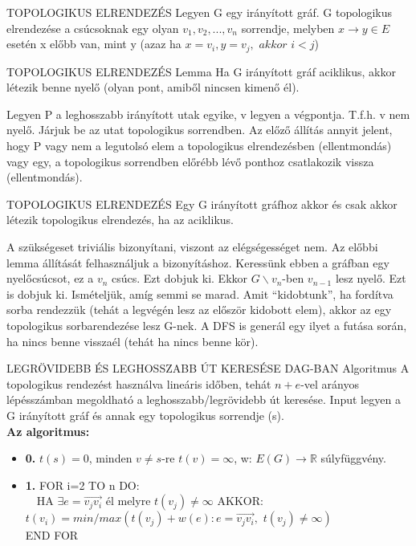 \begin{definicio}{TOPOLOGIKUS ELRENDEZÉS}
Legyen G egy irányított gráf. G topologikus elrendezése a csúcsoknak egy olyan $v_1, v_2,..., v_n$ sorrendje, melyben $x\rightarrow y \in E$ esetén x előbb van, mint y (azaz ha $x = v_i, y = v_j,\,\,akkor\,\,i<j$)
\end{definicio}

\begin{tetel}{TOPOLOGIKUS ELRENDEZÉS Lemma}
Ha G irányított gráf aciklikus, akkor létezik benne nyelő (olyan pont, amiből nincsen kimenő él).
\end{tetel}

\begin{bizonyitas}{}
Legyen P a leghosszabb irányított utak egyike, v legyen a végpontja. T.f.h. v nem nyelő. Járjuk be az utat topologikus sorrendben. Az előző állítás annyit jelent, hogy P vagy nem a legutolsó elem a topologikus elrendezésben (ellentmondás) vagy egy, a topologikus sorrendben előrébb lévő ponthoz csatlakozik vissza (ellentmondás).
\end{bizonyitas}

\begin{tetel}{TOPOLOGIKUS ELRENDEZÉS}
Egy G irányított gráfhoz akkor és csak akkor létezik topologikus elrendezés, ha az aciklikus.
\end{tetel}

\begin{bizonyitas}{}
A szükségeset triviális bizonyítani, viszont az elégségességet nem. Az előbbi lemma állítását felhasználjuk a bizonyításhoz. Keressünk ebben a gráfban egy nyelőcsúcsot, ez a $v_n$ csúcs. Ezt dobjuk ki. Ekkor $G\backslash{v_n}$-ben $v_{n-1}$ lesz nyelő. Ezt is dobjuk ki. Ismételjük, amíg semmi se marad. Amit ``kidobtunk'', ha fordítva sorba rendezzük (tehát a legvégén lesz az először kidobott elem), akkor az egy topologikus sorbarendezése lesz G-nek. A DFS is generál egy ilyet a futása során, ha nincs benne visszaél (tehát ha nincs benne kör).
\end{bizonyitas}

\begin{tetel}{LEGRÖVIDEBB ÉS LEGHOSSZABB ÚT KERESÉSE DAG-BAN Algoritmus}
A topologikus rendezést használva lineáris időben, tehát $n+e$-vel arányos lépésszámban megoldható a leghosszabb/legrövidebb út keresése.
Input legyen a G irányított gráf és annak egy topologikus sorrendje (s).
\\
\textbf{Az algoritmus:}
\begin{itemize}
\item{\textbf{0.}} $t(s) = 0$, minden $v \neq s$-re $t(v) = \infty$, w: $E(G)\rightarrow \mathbb{R}$ súlyfüggvény.
\item{\textbf{1.}} FOR i=2 TO n DO:\\
	$\quad$HA $\exists e = \overrightarrow{v_jv_i}$ él melyre $t(v_j) \neq \infty$ AKKOR: $t(v_i) = min/max(t(v_j)+w(e): e = \overrightarrow{v_jv_i},\,\, t(v_j) \neq \infty)$
\\END FOR
\end{itemize}
\end{tetel}
